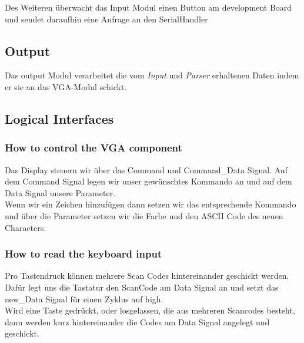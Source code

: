 Des Weiteren überwacht das Input Modul einen Button am development Board und sendet
daraufhin eine Anfrage an den SerialHandler
\subsection{Output}
Das output Modul verarbeitet die vom \textit{Input} und \textit{Parser} erhaltenen Daten indem er sie an das VGA-Modul schickt.

\subsection{Logical Interfaces}
\subsubsection{How to control the VGA component}
Das Display steuern wir über das Command und Command\_Data Signal. Auf dem Command Signal legen wir unser gewünschtes Kommando an und auf dem Data Signal unsere Parameter.\\
Wenn wir ein Zeichen hinzufügen dann setzen wir das entsprechende Kommando und über die Parameter setzen wir die Farbe und den ASCII Code des neuen Characters.
\subsubsection{How to read the keyboard input}
Pro Tastendruck können mehrere Scan Codes hintereinander geschickt werden. Dafür legt uns die Tastatur den ScanCode am Data Signal an und setzt das new\_Data Signal für einen Zyklus auf high.\\
Wird eine Taste gedrückt, oder losgelassen, die aus mehreren Scancodes besteht, dann werden kurz hintereinander die Codes am Data Signal angelegt und geschickt.